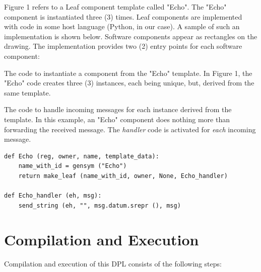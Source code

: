 \documentclass[10pt]{acmart}
\begin{document}
Figure 1 refers to a Leaf component template called "Echo". The "Echo"
component is instantiated three (3) times. Leaf components are
implemented with code in some host language (Python, in our case). A
sample of such an implementation is shown below. Software components
appear as rectangles on the drawing. The implementation provides two (2)
entry points for each software component:

The code to instantiate a component from the "Echo" template. In Figure
1, the "Echo" code creates three (3) instances, each being unique, but,
derived from the same template.

The code to handle incoming messages for each instance derived from the
template. In this example, an "Echo" component does nothing more than
forwarding the received message. The \emph{handler} code is activated for
\emph{each} incoming message.

\begin{verbatim}
def Echo (reg, owner, name, template_data):
    name_with_id = gensym ("Echo")
    return make_leaf (name_with_id, owner, None, Echo_handler)

def Echo_handler (eh, msg):
    send_string (eh, "", msg.datum.srepr (), msg)
\end{verbatim}

\section{Compilation and Execution}
Compilation and execution of this DPL consists of the following steps:
\end{document}
